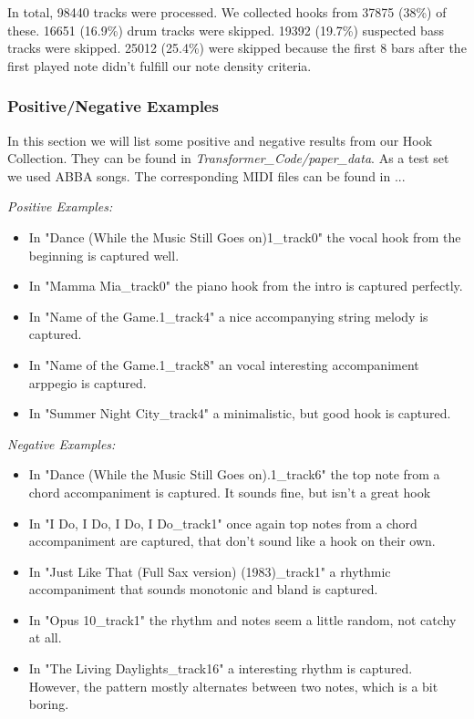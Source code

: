 \documentclass[a4paper,12pt]{extarticle}
\begin{document}
In total, 98440 tracks were processed. We collected hooks from 37875 (38\%) of these. 16651 (16.9\%) drum tracks were skipped. 19392 (19.7\%) suspected bass tracks were skipped. 25012 (25.4\%) were skipped because the first 8 bars after the first played note didn't fulfill our note density criteria.

\subsubsection{Positive/Negative Examples}
In this section we will list some positive and negative results from our Hook Collection. They can be found in \textit{Transformer\_Code/paper\_data}. As a test set we used ABBA songs. The corresponding MIDI files can be found in ... \newline

\textit{Positive Examples:}

\begin{itemize}
    \item In "Dance (While the Music Still Goes on)1\_track0" the vocal hook from the beginning is captured well.
    \item In "Mamma Mia\_track0" the piano hook from the intro is captured perfectly.
    \item In "Name of the Game.1\_track4" a nice accompanying string melody is captured.
    \item In "Name of the Game.1\_track8" an vocal interesting accompaniment arppegio is captured.
    \item In "Summer Night City\_track4" a minimalistic, but good hook is captured.
\end{itemize}

\textit{Negative Examples:}

\begin{itemize}
    \item In "Dance (While the Music Still Goes on).1\_track6" the top note from a chord accompaniment is captured. It sounds fine, but isn't a great hook
    \item In "I Do, I Do, I Do, I Do\_track1" once again top notes from a chord accompaniment are captured, that don't sound like a hook on their own.
    \item In "Just Like That (Full Sax version) (1983)\_track1" a rhythmic accompaniment that sounds monotonic and bland is captured.
    \item In "Opus 10\_track1" the rhythm and notes seem a little random, not catchy at all.
    \item In "The Living Daylights\_track16" a interesting rhythm is captured. However, the pattern mostly alternates between two notes, which is a bit boring.
\end{itemize}
\end{document}
